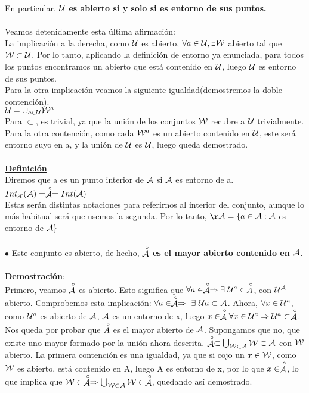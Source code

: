 En particular, \textbf{$\mathcal{U}$ es abierto si y solo si es entorno de sus puntos.}\\
\\
Veamos detenidamente esta última afirmación:\\
La implicación a la derecha, como $\mathcal{U}$ es abierto, $\forall a \in \mathcal{U}, \exists \mathcal{W}$ abierto tal que $\mathcal{W} \subset \mathcal{U}$. Por lo tanto, aplicando la definición de entorno ya enunciada, para todos los puntos encontramos un abierto que está contenido en $\mathcal{U}$, luego $\mathcal{U}$ es entorno de sus puntos.\\
Para la otra implicación veamos la siguiente igualdad(demostremos la doble contención).\\
$\mathcal{U} = \cup_{a\in\mathcal{U}}\mathcal{W}^{a}$\\
Para $\subset$, es trivial, ya que la unión de los conjuntos $\mathcal{W}$ recubre a $\mathcal{U}$ trivialmente. Para la otra contención, como cada $\mathcal{W}^{a}$ es un abierto contenido en $\mathcal{U}$, este será entorno suyo en a, y la unión de $\mathcal{U}$ es $\mathcal{U}$, luego queda demostrado.\\
\\

\textbf{\underline{Definición}}\\
Diremos que a es un punto interior de $\mathcal{A}$ si $\mathcal{A}$ es entorno de a.\\
$Int_{\mathcal{X}}(\mathcal{A}) = \stackrel{\ \circ}{\mathcal{A}} = Int(\mathcal{A})$\\
Estas serán distintas notaciones para referirnos al interior del conjunto, aunque lo más habitual será que usemos la segunda. Por lo tanto, $\mathcal{\AA{}}=\{a \in \ca : \ca$ es entorno de $\mathcal{A}\}$\\
\\
$\bullet$ Este conjunto es abierto, de hecho, \textbf{$\stackrel{\ \circ}{\mathcal{A}}$ es el mayor abierto contenido en $\mathcal{A}$}.\\
\\

\textbf{Demostración}:\\
Primero, veamos $\stackrel{\ \circ}{\mathcal{A}}$ es abierto. Esto significa que $\forall a \in \stackrel{\ \circ}{\mathcal{A}} \Rightarrow \exists\ \mathcal{U}^{a} \subset \stackrel{\ \circ}{A}$, con $\mathcal{U}^{\mathcal{A}}$ abierto. Comprobemos esta implicación: $\forall a \in \interior{\ca} \Rightarrow\ \exists\ \cu{a} \subset \ca$. Ahora, $\forall x \in \mathcal{U}^{a}$, como $\mathcal{U}^{a}$ es abierto de $\mathcal{A}$, $\mathcal{A}$ es un entorno de x, luego $x \in \stackrel{\ \circ}{\mathcal{A}} \forall x \in \mathcal{U}^{a} \Rightarrow\mathcal{U}^{a} \subset \stackrel{\ \circ}{\mathcal{A}}$.\\
Nos queda por probar que $\stackrel{\ \circ}{A}$ es el mayor abierto de $\mathcal{A}$. Supongamos que no, que existe uno mayor formado por la unión ahora descrita. $\stackrel{\ \circ}{\mathcal{A}} \subset \bigcup_{\mathcal{W} \subset \mathcal{A}}\mathcal{W} \subset \mathcal{A}$ con $\mathcal{W}$ abierto. La primera contención es una igualdad, ya que si cojo un $x \in \mathcal{W}$, como $\mathcal{W}$ es abierto, está contenido en A, luego A es entorno de x, por lo que $x \in \stackrel{\ \circ}{\mathcal{A}}$, lo que implica que $\mathcal{W} \subset \stackrel{\ \circ}{\mathcal{A}} \Rightarrow \bigcup_{\mathcal{W} \subset \mathcal{A}}\mathcal{W} \subset \stackrel{\ \circ}{\mathcal{A}}$, quedando así demostrado.\\
\\

